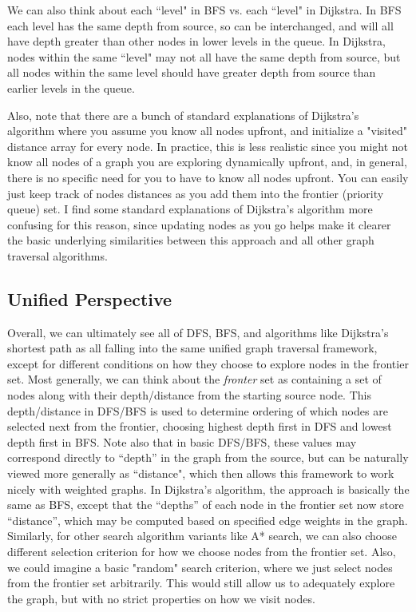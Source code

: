 \documentclass[10pt,a4paper]{article}
\begin{document}
We can also think about each ``level" in BFS vs. each ``level" in Dijkstra. In BFS each level has the same depth from source, so can be interchanged, and will all have depth greater than other nodes in lower levels in the queue. In Dijkstra, nodes within the same ``level" may not all have the same depth from source, but all nodes within the same level should have greater depth from source than earlier levels in the queue.

Also, note that there are a bunch of standard explanations of Dijkstra's algorithm where you assume you know all nodes upfront, and initialize a "visited" distance array for every node. In practice, this is less realistic since you might not know all nodes of a graph you are exploring dynamically upfront, and, in general, there is no specific need for you to have to know all nodes upfront. You can easily just keep track of nodes distances as you add them into the frontier (priority queue) set. I find some standard explanations of Dijkstra's algorithm more confusing for this reason, since updating nodes as you go helps make it clearer the basic underlying similarities between this approach and all other graph traversal algorithms.

\subsection{Unified Perspective}

Overall, we can ultimately see all of DFS, BFS, and algorithms like Dijkstra's shortest path as all falling into the same unified graph traversal framework, except for different conditions on how they choose to explore nodes in the frontier set. Most generally, we can think about the \textit{fronter} set as containing a set of nodes along with their depth/distance from the starting source node. This depth/distance in DFS/BFS is used to determine ordering of which nodes are selected next from the frontier, choosing highest depth first in DFS and lowest depth first in BFS. Note also that in basic DFS/BFS, these values may correspond directly to ``depth'' in the graph from the source, but can be naturally viewed more generally as ``distance", which then allows this framework to work nicely with weighted graphs. In Dijkstra's algorithm, the approach is basically the same as BFS, except that the ``depths'' of each node in the frontier set now store ``distance'', which may be computed based on specified edge weights in the graph. Similarly, for other search algorithm variants like A* search, we can also choose different selection criterion for how we choose nodes from the frontier set. Also, we could imagine a basic "random" search criterion, where we just select nodes from the frontier set arbitrarily. This would still allow us to adequately explore the graph, but with no strict properties on how we visit nodes.
\end{document}
